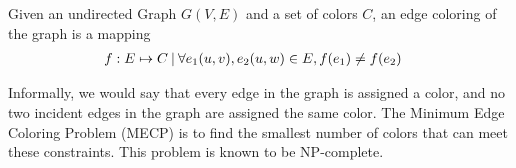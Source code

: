 Given an undirected Graph $G(V,E)$ and a set of colors $C$, an edge coloring of the graph is a mapping   
	\begin{align*} f: E \mapsto C {\: |\:} & \forall e_1(u,v), e_2(u,w) \in E, f(e_1) \ne f(e_2)
\end{align*} 

Informally, we would say that every edge in the graph is assigned a color, and no two incident edges in the graph are assigned the same color. The Minimum Edge Coloring Problem (MECP) is to find the smallest number of colors that can meet these constraints. This problem is known to be NP-complete.
